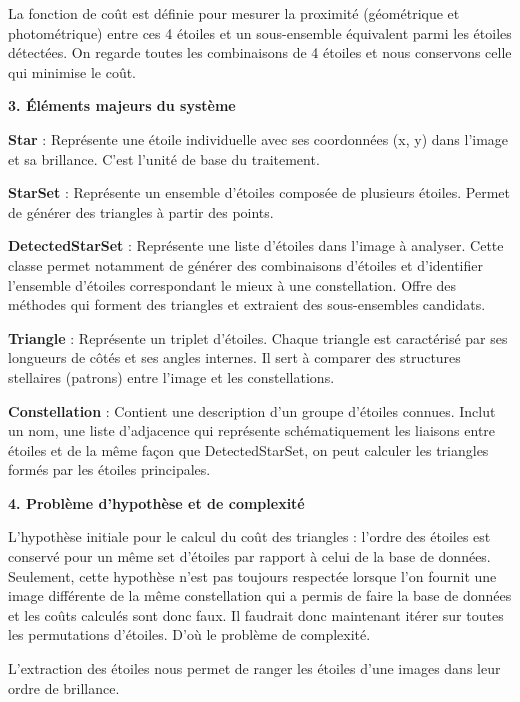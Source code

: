 La fonction de coût est définie pour mesurer la proximité (géométrique et photométrique) entre ces 4 étoiles et un sous-ensemble équivalent parmi les étoiles détectées. On regarde toutes les combinaisons de 4 étoiles et nous conservons celle qui minimise le coût.

\vspace{0.1cm}

\noindent \textbf{3. Éléments majeurs du système}

\textbf{Star} : Représente une étoile individuelle avec ses coordonnées (x, y) dans l’image et sa brillance. C’est l’unité de base du traitement.

\textbf{StarSet} : Représente un ensemble d'étoiles composée de plusieurs étoiles. Permet de générer des triangles à partir des points.

\textbf{DetectedStarSet} : Représente une liste d'étoiles dans l'image à analyser. Cette classe permet notamment de générer des combinaisons d'étoiles et d'identifier l'ensemble d'étoiles correspondant le mieux à une constellation. Offre des méthodes qui forment des triangles et extraient des sous-ensembles candidats.

\textbf{Triangle} : Représente un triplet d’étoiles. Chaque triangle est caractérisé par ses longueurs de côtés et ses angles internes. Il sert à comparer des structures stellaires (patrons) entre l’image et les constellations.

\textbf{Constellation} : Contient une description d’un groupe d’étoiles connues. Inclut un nom, une liste d'adjacence qui représente schématiquement les liaisons entre étoiles et de la même façon que DetectedStarSet, on peut calculer les triangles formés par les étoiles principales.

\noindent \textbf{4. Problème d'hypothèse et de complexité}

L'hypothèse initiale pour le calcul du coût des triangles : l'ordre des étoiles est conservé pour un même set d'étoiles par rapport à celui de la base de données. Seulement, cette hypothèse n'est pas toujours respectée lorsque l'on fournit une image différente de la même constellation qui a permis de faire la base de données et les coûts calculés sont donc faux. Il faudrait donc maintenant itérer sur toutes les permutations d'étoiles. D'où le problème de complexité.

\vspace{0.4cm}

L'extraction des étoiles nous permet de ranger les étoiles d'une images dans leur ordre de brillance.

